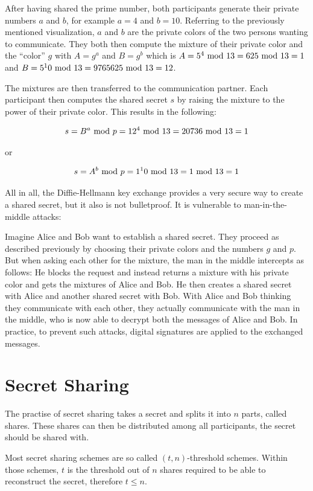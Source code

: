After having shared the prime number, both participants generate their
private numbers $a$ and $b$, for example $a = 4$ and $b = 10$. Referring to the
previously mentioned visualization, $a$ and $b$ are the private colors of the
two persons wanting to communicate. They both then compute the mixture of their
private color and the ``color'' $g$ with $A = g^a$ and $B = g^b$ which is
$A = 5^4 \ \text{mod}\ 13 = 625 \ \text{mod}\ 13 = 1$ and $B = 5^10 \ \text{mod}\ 13 = 9765625 \ \text{mod}\ 13 = 12$.

The mixtures are then transferred to the communication partner. Each
participant then computes the shared secret $s$ by raising the mixture
to the power of their private color. This results in the following:

$$s = B^a \ \text{mod}\ p = 12^4 \ \text{mod}\ 13 = 20736 \ \text{mod}\ 13 = 1$$

or

$$s = A^b \ \text{mod}\ p = 1^10 \ \text{mod}\ 13 = 1 \ \text{mod}\ 13 = 1$$

All in all, the Diffie-Hellmann key exchange provides a very secure way
to create a shared secret, but it also is not bulletproof. It is vulnerable
to man-in-the-middle attacks:

Imagine Alice and Bob want to establish a shared secret. They proceed as
described previously by choosing their private colors and the numbers $g$
and $p$. But when asking each other for the mixture, the man in the middle
intercepts as follows: He blocks the request and instead returns a mixture
with his private color and gets the mixtures of Alice and Bob. He then
creates a shared secret with Alice and another shared secret with Bob. With
Alice and Bob thinking they communicate with each other, they actually
communicate with the man in the middle, who is now able to decrypt both
the messages of Alice and Bob. In practice, to prevent such attacks, digital
signatures are applied to the exchanged messages.

\section{Secret Sharing}

The practise of secret sharing takes a secret and splits it into $n$ parts,
called shares. These shares can then be distributed among all participants, the
secret should be shared with.

Most secret sharing schemes are so called $(t, n)$-threshold schemes. Within
those schemes, $t$ is the threshold out of $n$ shares required to be able to
reconstruct the secret, therefore $t \leq n$.

